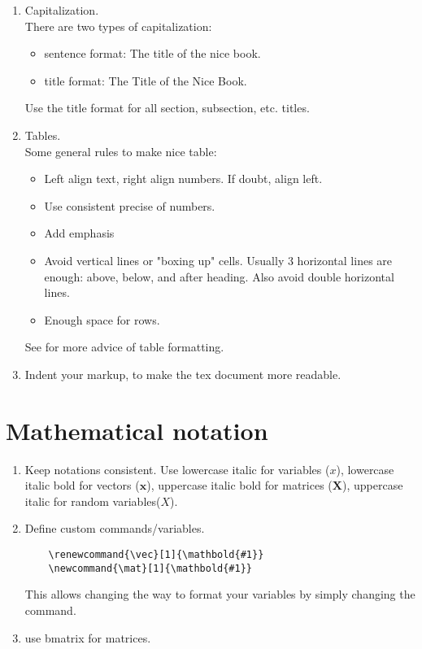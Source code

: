 \documentclass{article}
\begin{document}
\begin{enumerate}
   \item Capitalization.\\
   There are two types of capitalization:
   \begin{itemize}
       \item sentence format: The title of the nice book.
       \item title format: The Title of the Nice Book.
   \end{itemize}
   Use the title format for all section, subsection, etc. titles.
   
   \item Tables.\\
   Some general rules to make nice table:
   \begin{itemize}
       \item Left align text, right align numbers. If doubt, align left. 
       \item Use consistent precise of numbers. 
       \item Add emphasis 
       \item Avoid vertical lines or "boxing up" cells. Usually 3 horizontal lines are
enough: above, below, and after heading. Also avoid double horizontal lines.
        \item Enough space for rows.
   \end{itemize}
   See \cite{GuideTables} for more advice of table formatting. 
   
   \item Indent your markup, to make the tex document more readable.
\end{enumerate}

\section{Mathematical notation}
\begin{enumerate}
    \item Keep notations consistent. Use lowercase italic for variables ($x$), lowercase italic bold for vectors ($\mathbold{x}$), uppercase italic bold for matrices ($\mathbold{X}$), uppercase italic for random variables($X$).
    \item Define custom commands/variables.
    \begin{lstlisting}
    \renewcommand{\vec}[1]{\mathbold{#1}}
    \newcommand{\mat}[1]{\mathbold{#1}}
    \end{lstlisting}
    This allows changing the way to format your variables by simply changing the command. 
        
    
    \item use bmatrix for matrices.
\end{enumerate}{}
\end{document}
